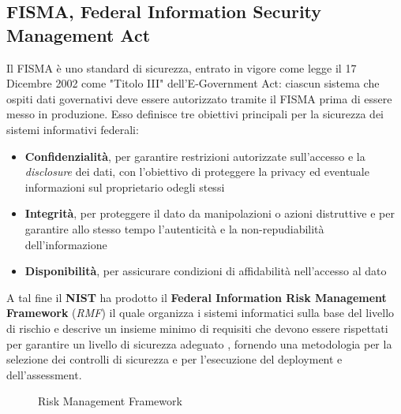 \documentclass[../main.tex]{subfiles}
\begin{document}
\subsection{FISMA, Federal Information Security Management Act}
Il FISMA è uno standard di sicurezza, entrato in vigore come legge il 17 Dicembre 2002 come "Titolo III" dell'E-Government Act\cite{united2004information}: ciascun sistema che ospiti dati governativi deve essere autorizzato tramite il FISMA prima di essere messo in produzione.
Esso definisce tre obiettivi principali per la sicurezza dei sistemi informativi federali:
\begin{itemize}
    \item \textbf{Confidenzialità}, per garantire restrizioni autorizzate sull'accesso e la \textit{disclosure} dei dati, con l'obiettivo di proteggere la privacy ed eventuale informazioni sul proprietario odegli stessi
    \item \textbf{Integrità}, per proteggere il dato da manipolazioni o azioni distruttive e per garantire allo stesso tempo l'autenticità e la non-repudiabilità dell'informazione
    \item \textbf{Disponibilità}, per assicurare condizioni di affidabilità nell'accesso al dato
\end{itemize}

A tal fine il \textbf{NIST} ha prodotto il \textbf{Federal Information Risk Management Framework} (\textit{RMF}) il quale organizza i sistemi informatici sulla base del livello di rischio e descrive un insieme minimo di requisiti che devono essere rispettati per garantire un livello di sicurezza adeguato \cite{nist2003nist}, fornendo una metodologia per la selezione dei controlli di sicurezza e per l'esecuzione del deployment e dell'assessment.

\begin{figure}[H]
\centering
{}
\caption{Risk Management Framework \cite{nist2003nist} }\label{fig:riskmanagementfw}
\end{figure}
\end{document}
